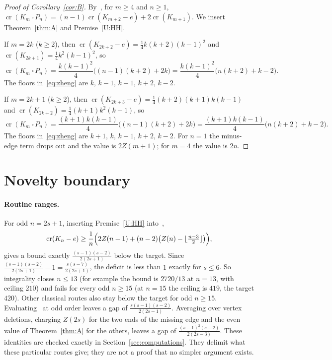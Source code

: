 \documentclass[11pt,a4paper]{article}
\theoremstyle{definition}
\theoremstyle{remark}
\numberwithin{equation}{section}
\newcommand{\crn}{\operatorname{cr}}
\begin{document}
\begin{proof}[Proof of Corollary~\ref{cor:B}]
By~\cite[Corollary~5.1]{OWH}, for $m\ge4$ and $n\ge1$, $\crn(K_m\,\square\,P_n)=(n-1)\crn(K_{m+2}-e)+2\crn(K_{m+1})$. We insert Theorem~\ref{thm:A} and Premise~\ref{U:HH}.

If $m=2k$ ($k\ge2$), then $\crn(K_{2k+2}-e)=\frac14k(k+2)(k-1)^2$ and $\crn(K_{2k+1})=\frac14k^2(k-1)^2$, so
\[
\crn(K_m\,\square\,P_n)=\frac{k(k-1)^2}{4}\bigl((n-1)(k+2)+2k\bigr)=\frac{k(k-1)^2}{4}\bigl(n(k+2)+k-2\bigr).
\]
The floors in~\eqref{eq:zheng} are $k,\,k-1,\,k-1,\,k+2,\,k-2$.

If $m=2k+1$ ($k\ge2$), then $\crn(K_{2k+3}-e)=\frac14(k+2)(k+1)k(k-1)$ and $\crn(K_{2k+2})=\frac14(k+1)k^2(k-1)$, so
\[
\crn(K_m\,\square\,P_n)=\frac{(k+1)k(k-1)}{4}\bigl((n-1)(k+2)+2k\bigr)=\frac{(k+1)k(k-1)}{4}\bigl(n(k+2)+k-2\bigr).
\]
The floors in~\eqref{eq:zheng} are $k+1,\,k,\,k-1,\,k+2,\,k-2$. For $n=1$ the minus-edge term drops out and the value is $2Z(m+1)$; for $m=4$ the value is $2n$.
\end{proof}

\section{Novelty boundary}\label{sec:novelty}

\paragraph{Routine ranges.} For odd $n=2s+1$, inserting Premise~\ref{U:HH} into~\cite[Theorem~3.1]{OWH},
\[
\crn(K_n-e)\ge\frac1n\Bigl(2Z(n-1)+(n-2)\bigl(Z(n)-\lfloor\tfrac{n-3}2\rfloor\bigr)\Bigr),
\]
gives a bound exactly $\frac{(s-1)(s-2)}{2(2s+1)}$ below the target. Since $\frac{(s-1)(s-2)}{2(2s+1)}-1=\frac{s(s-7)}{2(2s+1)}$, the deficit is less than $1$ exactly for $s\le6$. So integrality closes $n\le13$ (for example the bound is $2720/13$ at $n=13$, with ceiling $210$) and fails for every odd $n\ge15$ (at $n=15$ the ceiling is $419$, the target $420$). Other classical routes also stay below the target for odd $n\ge15$. Evaluating~\cite[Theorem~3.2]{OWH} at odd order leaves a gap of $\frac{s(s-1)(s-2)}{2(2s-1)}$. Averaging over vertex deletions, charging $Z(2s)$ for the two ends of the missing edge and the even value of Theorem~\ref{thm:A} for the others, leaves a gap of $\frac{(s-1)^2(s-2)}{2(2s-3)}$. These identities are checked exactly in Section~\ref{sec:computations}. They delimit what these particular routes give; they are not a proof that no simpler argument exists.
\end{document}
